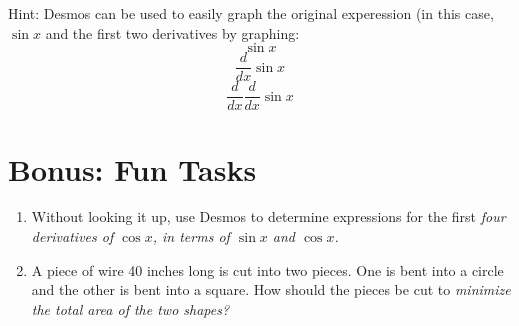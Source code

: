 \documentclass[11pt]{article}
\theoremstyle{definition}
\theoremstyle{remark}
\begin{document}
Hint:  Desmos can be used to easily graph the original experession (in this case, $\sin x$ and the first two derivatives by graphing:
 	\[\sin x\]
    \[\frac{d}{dx}\sin x\]
    \[\frac{d}{dx}\frac{d}{dx}\sin x\]
    
\section*{Bonus: Fun Tasks}
\begin{enumerate}
\item Without looking it up, use Desmos to determine expressions for the first \em four \em derivatives of $\cos x$, in terms of $\sin x$ and $\cos x$.
\item A piece of wire 40 inches long is cut into two pieces.  One is bent into a circle and the other is bent into a square.  How should the pieces be cut to \em minimize \em the total area of the two shapes?
\end{enumerate}
\end{document}
